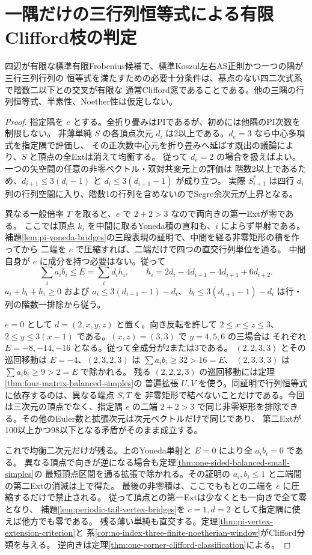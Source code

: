 \section{一隅だけの三行列恒等式による有限Clifford枝の判定}
\label{sec:single-three-matrix-windows}
\begin{theorem}\label{thm:single-three-matrix-windows}
四辺が有限な標準有限Frobenius候補で、標準Koszul左右AS正則かつ一つの隅が三行三列行列の
恒等式を満たすための必要十分条件は、基点のない四二次式系で階数二以下との交叉が有限な
通常Clifford窓であることである。他の三隅の行列恒等式、半素性、Noether性は仮定しない。
\end{theorem}
\begin{proof}
指定隅を $e$ とする。全折り畳みはPIであるが、初めには他隅のPI次数を制限しない。
非薄単純 $S$ の各頂点次元 $d_i$ は2以上である。$d_e=3$ なら中心多項式を指定隅で評価し、
その正次数中心元を折り畳みへ延ばす既出の議論により、$S$ と頂点の全Extは消えて均衡する。
従って $d_e=2$ の場合を扱えばよい。一つの矢空間の任意の非零ベクトル・双対共変元上の評価は
階数2以上であるため、$d_{i+1}\le3(d_i-1)$ と $d_i\le3(d_{i+1}-1)$ が成り立つ。
実際 $S_{i+1}^*$ は四行 $d_i$ 列の行列空間に入り、階数1の行列を含めないのでSegre余次元が上界となる。

異なる一般倍率 $T$ を取ると、$e$ で $2+2>3$ なので両向きの第一Extが零である。
ここでは頂点 $k_i$ を中間に取るYoneda積の直和も、$i$ によらず単射である。
補題\ref{lem:pi-yoneda-bridges}の三段表現の証明で、中間を経る非零矩形の積を作ってから
二端を $e$ で圧縮すれば、二端だけで四つの直交行列単位を通る。
中間自身が $e$ に成分を持つ必要はない。従って
\[
 \sum_i a_i b_i\le E=\sum_i d_i h_i,\qquad
 h_i=2d_i-4d_{i-1}-4d_{i+1}+6d_{i+2}.
\]
$a_i+b_i+h_i\ge0$ および $a_i\le3(d_{i-1}-1)-d_i$、
$b_i\le3(d_{i+1}-1)-d_i$ は行・列の階数一排除から従う。

$e=0$ として $d=(2,x,y,z)$ と置く。向き反転を許して $2\le x\le z\le3$、
$2\le y\le3(x-1)$ である。$(x,z)=(3,3)$ で $y=4,5,6$ の三場合は
それぞれ $E=-8,-14,-16$ となる。従って全成分が2または3である。
$(2,2,3,3)$ とその巡回移動は $E=-4$、$(2,3,2,3)$ は $\sum a_i b_i\ge32>16=E$、
$(2,3,3,3)$ は $\sum a_i b_i\ge9>2=E$ で除かれる。
残る $(2,2,2,3)$ の巡回移動には定理\ref{thm:four-matrix-balanced-simples}の
普遍拡張 $U,V$ を使う。同証明で行列恒等式に依存するのは、異なる端点 $S,T$ を
非零矩形で結べないことだけである。今回は三次元の頂点でなく、指定隅 $e$ の二端
$2+2>3$ で同じ非零矩形を排除できる。その他のEuler数と拡張次元は次元ベクトルだけで同じであり、
第二Extが100以上かつ98以下となる矛盾がそのまま成立する。

これで均衡二次元だけが残る。上のYoneda単射と $E=0$ により全 $a_i b_i=0$ である。
異なる頂点で向きが逆になる場合も定理\ref{thm:one-sided-balanced-small-simples}の
最短頂点区間を通る拡張で除かれる。その証明の $a_i,b_i\le1$ と二端間の第二Extの消滅は上で得た。
最後の非零積は、ここでももとの二端を $e$ に圧縮するだけで禁止される。
従って頂点との第一Extは少なくとも一向きで全て零となり、
補題\ref{lem:periodic-tail-vertex-bridges}を $c=1,d=2$ として指定隅に使えば他方でも零である。
残る薄い単純も直交する。定理\ref{thm:pi-vertex-extension-criterion}と
系\ref{cor:no-index-three-finite-noetherian-window}がClifford分類を与える。
逆向きは定理\ref{thm:one-corner-clifford-classification}による。
\end{proof}
